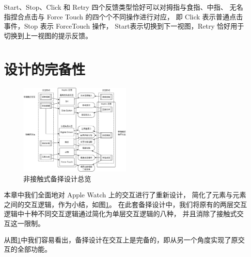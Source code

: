 Start、Stop、Click 和 Retry 四个反馈类型恰好可以对拇指与食指、中指、
无名指捏合点击与 Force Touch 的四个个不同操作进行对应，
即 Click 表示普通点击事件，Stop 表示 ForceTouch 操作，
Start表示切换到下一视图，Retry 恰好用于切换到上一视图的提示反馈。

\section{设计的完备性}
\label{sec:completeless}

\begin{figure}[H]
    \kaishu
    \centering
    \includegraphics[width=0.5\textwidth]{figures/interaction}
    \caption{\kaishu 非接触式备择设计总览}
    \label{fig:interaction}
\end{figure}

本章中我们全面地对 Apple Watch 上的交互进行了重新设计，
简化了元素与元素之间的交互逻辑，作为小结，如图\ref{fig:interaction}。
在此套备择设计中，我们将原有的两层交互逻辑中十种不同交互逻辑通过简化为单层交互逻辑的八种，
并且消除了接触式交互这一限制。

从图\ref{fig:interaction}中我们容易看出，备择设计在交互上是完备的，即从另一个角度实现了原交互的全部功能。
